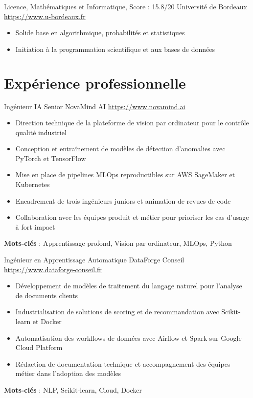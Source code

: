 \documentclass[a4paper, serif, 10pt]{moderncv}
\begin{document}
        {Licence, Mathématiques et Informatique, Score : 15.8/20}
        {Université de Bordeaux}
        {\url{https://www.u-bordeaux.fr}}
        {}
        {\begin{itemize}
\item Solide base en algorithmique, probabilités et statistiques
\item Initiation à la programmation scientifique et aux bases de données
\end{itemize}}
\section{Expérience professionnelle}

        {Ingénieur IA Senior}
        {NovaMind AI}
        {\url{https://www.novamind.ai}}
        {}
        {\begin{itemize}
\item Direction technique de la plateforme de vision par ordinateur pour le contrôle qualité industriel
\item Conception et entraînement de modèles de détection d'anomalies avec PyTorch et TensorFlow
\item Mise en place de pipelines MLOps reproductibles sur AWS SageMaker et Kubernetes
\item Encadrement de trois ingénieurs juniors et animation de revues de code
\item Collaboration avec les équipes produit et métier pour prioriser les cas d'usage à fort impact
\end{itemize}
\textbf{Mots-clés} : Apprentissage profond, Vision par ordinateur, MLOps, Python}

        {Ingénieur en Apprentissage Automatique}
        {DataForge Conseil}
        {\url{https://www.dataforge-conseil.fr}}
        {}
        {\begin{itemize}
\item Développement de modèles de traitement du langage naturel pour l'analyse de documents clients
\item Industrialisation de solutions de scoring et de recommandation avec Scikit-learn et Docker
\item Automatisation des workflows de données avec Airflow et Spark sur Google Cloud Platform
\item Rédaction de documentation technique et accompagnement des équipes métier dans l'adoption des modèles
\end{itemize}
\textbf{Mots-clés} : NLP, Scikit-learn, Cloud, Docker}
\end{document}
